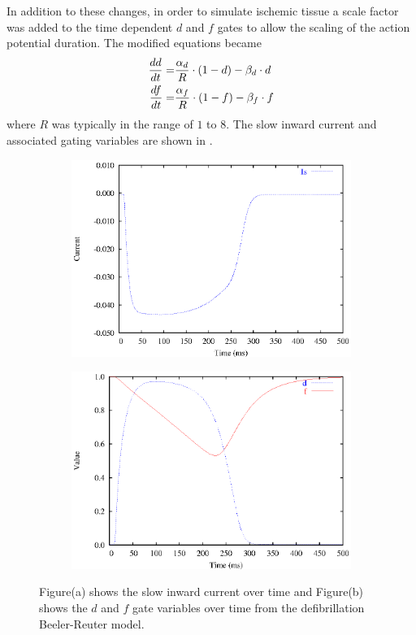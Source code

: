 In addition to these changes, in order to simulate ischemic tissue a scale
factor was added to the time dependent $d$ and $f$ gates to allow the scaling
of the action potential duration. The
modified equations became
\begin{align}
   \dfrac{ d d}{d t} =&\dfrac{\alpha_{d}}{R}\cdot \left( 1-d \right)-\beta_{d}\cdot  d \\
   \dfrac{ d f}{d t} =&\dfrac{\alpha_{f}}{R}\cdot \left( 1-f \right)-\beta_{f}\cdot  f
\end{align}
where $R$ was typically in the range of $1$ to $8$. 
The slow inward current and associated gating variables are shown in
.
\begin{figure}[hbtp] 
  \centering
  \begin{subfigure}[b]{0.45\linewidth}
    \centering
    \includegraphics[width=\textwidth]{cardiac_electrophysiology/epsfiles/BRDR_Is.eps}
    \caption{}
  \end{subfigure}
  \hfill
  \begin{subfigure}[b]{0.45\linewidth}
    \centering
    \includegraphics[width=\textwidth]{cardiac_electrophysiology/epsfiles/BRDR_df.eps}
    \caption{}
  \end{subfigure}
  \caption[Defibrillation Beeler-Reuter slow inward current]{Figure(a) shows the
    slow inward current over time and Figure(b) shows the
    $d$ and $f$ gate variables over time from the defibrillation Beeler-Reuter model.}
  \label{fig:BRDR_Is_traces}
\end{figure}
%
